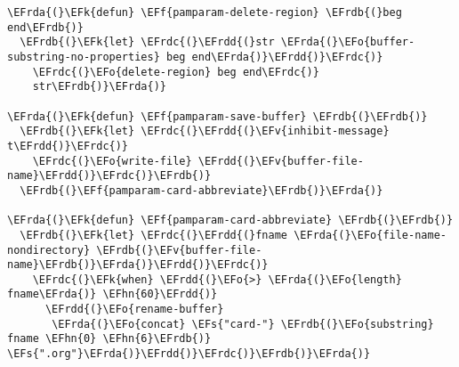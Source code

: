 \documentclass[a4wide,10pt]{article}
\newcommand{\EFs}[1]{\textcolor{EFs}{#1}} %
\newcommand{\EFk}[1]{\textcolor{EFk}{#1}} %
\newcommand{\EFf}[1]{\textcolor{EFf}{#1}} %
\newcommand{\EFv}[1]{\textcolor{EFv}{#1}} %
\newcommand{\EFo}[1]{\textcolor{EFo}{#1}} %
\newcommand{\EFhn}[1]{\textcolor{EFhn}{\textbf{#1}}} %
\newcommand{\EFrda}[1]{\textcolor{EFrda}{#1}} %
\newcommand{\EFrdb}[1]{\textcolor{EFrdb}{#1}} %
\newcommand{\EFrdc}[1]{\textcolor{EFrdc}{#1}} %
\newcommand{\EFrdd}[1]{\textcolor{EFrdd}{#1}} %
\begin{document}
\begin{Code}
\begin{Verbatim}
\EFrda{(}\EFk{defun} \EFf{pamparam-delete-region} \EFrdb{(}beg end\EFrdb{)}
  \EFrdb{(}\EFk{let} \EFrdc{(}\EFrdd{(}str \EFrda{(}\EFo{buffer-substring-no-properties} beg end\EFrda{)}\EFrdd{)}\EFrdc{)}
    \EFrdc{(}\EFo{delete-region} beg end\EFrdc{)}
    str\EFrdb{)}\EFrda{)}

\EFrda{(}\EFk{defun} \EFf{pamparam-save-buffer} \EFrdb{(}\EFrdb{)}
  \EFrdb{(}\EFk{let} \EFrdc{(}\EFrdd{(}\EFv{inhibit-message} t\EFrdd{)}\EFrdc{)}
    \EFrdc{(}\EFo{write-file} \EFrdd{(}\EFv{buffer-file-name}\EFrdd{)}\EFrdc{)}\EFrdb{)}
  \EFrdb{(}\EFf{pamparam-card-abbreviate}\EFrdb{)}\EFrda{)}

\EFrda{(}\EFk{defun} \EFf{pamparam-card-abbreviate} \EFrdb{(}\EFrdb{)}
  \EFrdb{(}\EFk{let} \EFrdc{(}\EFrdd{(}fname \EFrda{(}\EFo{file-name-nondirectory} \EFrdb{(}\EFv{buffer-file-name}\EFrdb{)}\EFrda{)}\EFrdd{)}\EFrdc{)}
    \EFrdc{(}\EFk{when} \EFrdd{(}\EFo{>} \EFrda{(}\EFo{length} fname\EFrda{)} \EFhn{60}\EFrdd{)}
      \EFrdd{(}\EFo{rename-buffer}
       \EFrda{(}\EFo{concat} \EFs{"card-"} \EFrdb{(}\EFo{substring} fname \EFhn{0} \EFhn{6}\EFrdb{)} \EFs{".org"}\EFrda{)}\EFrdd{)}\EFrdc{)}\EFrdb{)}\EFrda{)}


\end{Verbatim}
\end{Code}
\end{document}
